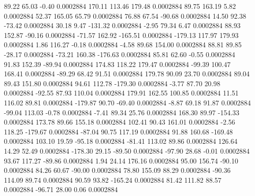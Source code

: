        89.22       65.03       -0.40     0.0002884
      170.11      113.46      179.48     0.0002884
       89.75      163.19        5.82     0.0002884
       52.37      165.05       65.79     0.0002884
       76.88       67.54      -90.68     0.0002884
       14.50       92.38      -73.42     0.0002884
       30.18        9.47     -131.32     0.0002884
       -2.95       79.34        6.47     0.0002884
       88.93      152.87      -90.16     0.0002884
      -71.57      162.92     -165.51     0.0002884
     -179.13      117.97      179.93     0.0002884
        1.86      116.27       -0.18     0.0002884
       -4.58       89.68      154.00     0.0002884
       88.81       89.85      -28.17     0.0002884
      -73.21      160.38     -176.63     0.0002884
       85.81       62.60       -0.55     0.0002884
       91.83      152.39      -89.94     0.0002884
      174.83      118.22      179.47     0.0002884
      -99.39      100.47      168.41     0.0002884
      -89.29       68.42       91.51     0.0002884
      179.78       90.09       23.70     0.0002884
       89.04       89.43      151.80     0.0002884
       94.61      112.78     -179.30     0.0002884
       -3.77       87.70       20.98     0.0002884
      -92.55       87.93      110.04     0.0002884
      179.91      162.55      100.85     0.0002884
       11.51      116.02       89.81     0.0002884
     -179.87       90.70      -69.40     0.0002884
       -8.87       69.18       91.87     0.0002884
      -99.04      113.03       -0.78     0.0002884
       -7.41       89.34       25.76     0.0002884
      168.30       89.97     -154.33     0.0002884
      173.78       89.66      155.18     0.0002884
      102.41       90.43      161.01     0.0002884
       -2.56      118.25     -179.67     0.0002884
      -87.04       90.75      117.19     0.0002884
       91.88      160.68     -169.48     0.0002884
      103.10       19.59      -95.18     0.0002884
      -81.41      113.02       89.86     0.0002884
      126.64       14.29       52.49     0.0002884
     -178.30       29.15      -89.50     0.0002884
      -97.90       28.68       -0.01     0.0002884
       93.67      117.27      -89.86     0.0002884
        1.94       24.14      176.16     0.0002884
       95.00      156.74      -90.10     0.0002884
       84.26       60.67      -90.00     0.0002884
       78.80      155.09       88.29     0.0002884
      -90.36      114.09       89.74     0.0002884
       90.59       93.82     -165.24     0.0002884
       81.42      111.82       88.57     0.0002884
      -96.71       28.00        0.06     0.0002884
